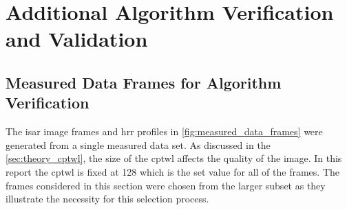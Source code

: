 \documentclass[class=report,11pt,crop=false]{standalone}
\begin{document}
\appendix
\chapter{Additional Algorithm Verification and Validation \label{apndxA}}
\section{Measured Data Frames for Algorithm Verification} \label{apndxA:verification_frames}
    The \gls{isar} image frames and \gls{hrr} profiles in \autoref{fig:measured_data_frames} were generated from a single measured data set. As discussed in the \autoref{sec:theory_cptwl}, the size of the \gls{cptwl} affects the quality of the image. In this report the \gls{cptwl} is fixed at 128 which is the set value for all of the frames. The frames considered in this section were chosen from the larger subset as they illustrate the necessity for this selection process. 
\end{document}
